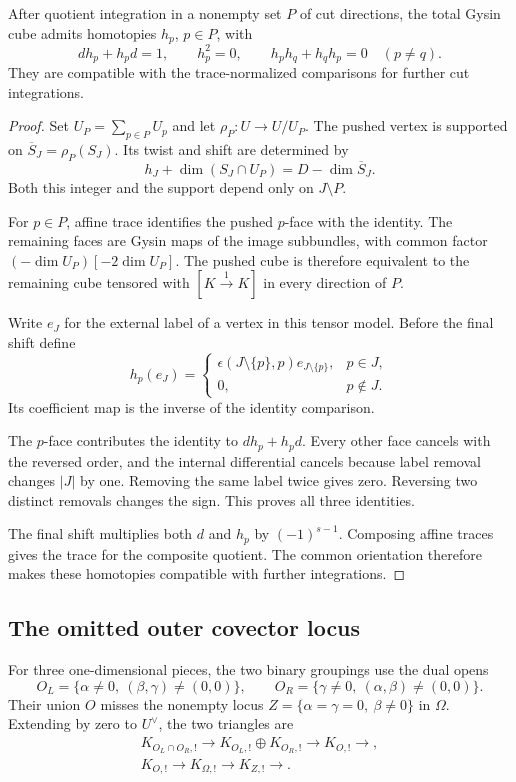 \begin{theorem}\label{v4-arith:hall:thm:contractions}
After quotient integration in a nonempty set $P$ of cut directions,
the total Gysin cube admits homotopies $h_p$, $p\in P$, with
\[
 dh_p+h_pd=1,\qquad h_p^2=0,\qquad
 h_ph_q+h_qh_p=0\quad(p\ne q).
\]
They are compatible with the trace-normalized comparisons for
further cut integrations.
\end{theorem}
\begin{proof}
Set $U_P=\sum_{p\in P}U_p$ and let $\rho_P:U\to U/U_P$.
The pushed vertex is supported on $\overline S_J=\rho_P(S_J)$.
Its twist and shift are determined by
\[
 h_J+\dim(S_J\cap U_P)=D-\dim\overline S_J.
\]
Both this integer and the support depend only on $J\setminus P$.

For $p\in P$, affine trace identifies the pushed $p$-face with
the identity. The remaining faces are Gysin maps of the image
subbundles, with common factor $(-\dim U_P)[-2\dim U_P]$.
The pushed cube is therefore equivalent to the remaining cube
tensored with $[K\xrightarrow{1}K]$ in every direction of $P$.

Write $e_J$ for the external label of a vertex in this tensor model.
Before the final shift define
\[
 h_p(e_J)=
 \begin{cases}
 \epsilon(J\setminus\{p\},p)e_{J\setminus\{p\}},&p\in J,\\
 0,&p\notin J.
 \end{cases}
\]
Its coefficient map is the inverse of the identity comparison.

The $p$-face contributes the identity to $dh_p+h_pd$.
Every other face cancels with the reversed order, and the internal
differential cancels because label removal changes $|J|$ by one.
Removing the same label twice gives zero. Reversing two distinct
removals changes the sign. This proves all three identities.

The final shift multiplies both $d$ and $h_p$ by $(-1)^{s-1}$.
Composing affine traces gives the trace for the composite quotient.
The common orientation therefore makes these homotopies compatible
with further integrations.
\end{proof}

\subsection{The omitted outer covector locus}

For three one-dimensional pieces, the two binary groupings use
the dual opens
\[
 O_L=\{\alpha\ne0,\ (\beta,\gamma)\ne(0,0)\},\qquad
 O_R=\{\gamma\ne0,\ (\alpha,\beta)\ne(0,0)\}.
\]
Their union $O$ misses the nonempty locus
$Z=\{\alpha=\gamma=0,\ \beta\ne0\}$ in $\Omega$.
Extending by zero to $U^\vee$, the two triangles are
\[
 \begin{gathered}
 K_{O_L\cap O_R,!}\longrightarrow K_{O_L,!}\oplus K_{O_R,!}
       \longrightarrow K_{O,!}\longrightarrow,\\
 K_{O,!}\longrightarrow K_{\Omega,!}
       \longrightarrow K_{Z,!}\longrightarrow.
 \end{gathered}
\]

